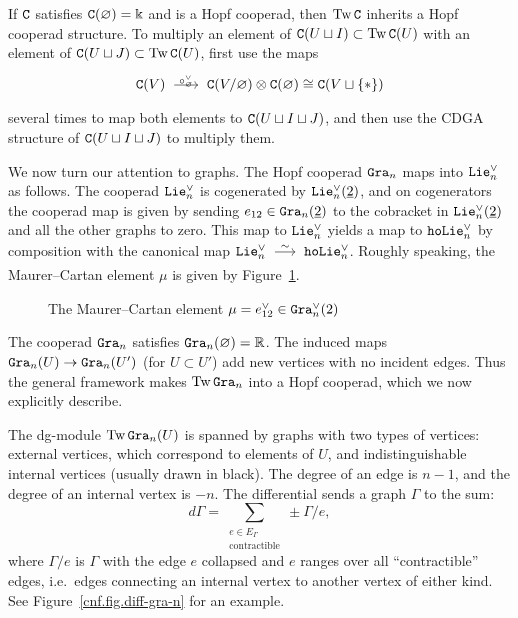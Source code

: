 If $\mathtt{C}$ satisfies $\mathtt{C}(\varnothing) = \Bbbk$ and is a Hopf cooperad, then $\operatorname{Tw}\mathtt{C}$ inherits a Hopf cooperad structure.
To multiply an element of $\mathtt{C}(U \sqcup I) \subset \operatorname{Tw}\mathtt{C}(U)$ with an element of $\mathtt{C}(U \sqcup J) \subset \operatorname{Tw}\mathtt{C}(U)$, first use the maps
\[ \CC(V) \tkrightarrow{\circ_{\varnothing}^{\vee}} \CC(V / \varnothing) \otimes \CC(\varnothing) \cong \CC(V \sqcup \{*\}) \]
several times to map both elements to $\mathtt{C}(U \sqcup I \sqcup J)$, and then use the CDGA structure of $\mathtt{C}(U \sqcup I \sqcup J)$ to multiply them.

We now turn our attention to graphs.
The Hopf cooperad $\mathtt{Gra}_{n}$ maps into $\mathtt{Lie}_{n}^{\vee}$ as follows.
The cooperad $\mathtt{Lie}_{n}^{\vee}$ is cogenerated by $\mathtt{Lie}_{n}^{\vee}(\underline{2})$, and on cogenerators the cooperad map is given by sending $e_{12} \in \mathtt{Gra}_{n}(\underline{2})$ to the cobracket in $\mathtt{Lie}_{n}^{\vee}(\underline{2})$ and all the other graphs to zero.
This map to $\mathtt{Lie}_{n}^{\vee}$ yields a map to $\mathtt{hoLie}_{n}^{\vee}$ by composition with the canonical map $\Lie_{n}^{\vee} \qiso \hoLie_{n}^{\vee}$.
Roughly speaking, the Maurer--Cartan element $\mu$ is given by Figure~\ref{cnf.fig.maurer-cartan-element}.

\begin{figure}[htbp]
  \centering
  \caption{The Maurer--Cartan element $\mu = e_{12}^{\vee} \in \mathtt{Gra}_n^\vee(2)$}
  \label{cnf.fig.maurer-cartan-element}
\end{figure}

The cooperad $\mathtt{Gra}_{n}$ satisfies $\mathtt{Gra}_{n}(\varnothing) = \mathbb{R}$.
The induced maps $\mathtt{Gra}_{n}(U) \to \mathtt{Gra}_{n}(U')$ (for $U \subset U'$) add new vertices with no incident edges.
Thus the general framework makes $\operatorname{Tw} \mathtt{Gra}_{n}$ into a Hopf cooperad, which we now explicitly describe.

The dg-module $\operatorname{Tw}\mathtt{Gra}_{n}(U)$ is spanned by graphs with two types of vertices: external vertices, which correspond to elements of $U$, and indistinguishable internal vertices (usually drawn in black).
The degree of an edge is $n-1$, and the degree of an internal vertex is $-n$.
The differential sends a graph $\Gamma$ to the sum:
\[ d\Gamma = \sum_{\substack{e \in E_{\Gamma} \\ \text{contractible}}} \pm \Gamma / e, \]
where $\Gamma/e$ is $\Gamma$ with the edge $e$ collapsed and $e$ ranges over all ``contractible'' edges, i.e.\ edges connecting an internal vertex to another vertex of either kind.
See Figure~\ref{cnf.fig.diff-gra-n} for an example.

